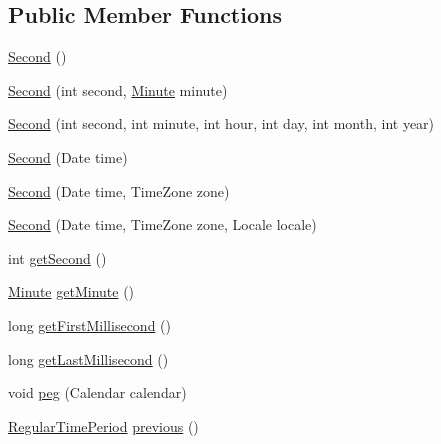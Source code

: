 \subsection*{Public Member Functions}
\begin{DoxyCompactItemize}
\item 
\mbox{\hyperlink{classorg_1_1jfree_1_1data_1_1time_1_1_second_a98b0191197851ed1fb2a351481ba4c08}{Second}} ()
\item 
\mbox{\hyperlink{classorg_1_1jfree_1_1data_1_1time_1_1_second_a120110e2361f440be3cb36c107f43898}{Second}} (int second, \mbox{\hyperlink{classorg_1_1jfree_1_1data_1_1time_1_1_minute}{Minute}} minute)
\item 
\mbox{\hyperlink{classorg_1_1jfree_1_1data_1_1time_1_1_second_a08c78518279e77e26804394a1cadd1c5}{Second}} (int second, int minute, int hour, int day, int month, int year)
\item 
\mbox{\hyperlink{classorg_1_1jfree_1_1data_1_1time_1_1_second_a99b5f9abe2c62ad3ec4a8fcea480c110}{Second}} (Date time)
\item 
\mbox{\hyperlink{classorg_1_1jfree_1_1data_1_1time_1_1_second_a6349bf85897f77365176fd8c3e306bc2}{Second}} (Date time, Time\+Zone zone)
\item 
\mbox{\hyperlink{classorg_1_1jfree_1_1data_1_1time_1_1_second_a37ddbb0efcd87f2f6a6bdce9df99ad81}{Second}} (Date time, Time\+Zone zone, Locale locale)
\item 
int \mbox{\hyperlink{classorg_1_1jfree_1_1data_1_1time_1_1_second_a14d76d21578a7d14d87e32d1e37997de}{get\+Second}} ()
\item 
\mbox{\hyperlink{classorg_1_1jfree_1_1data_1_1time_1_1_minute}{Minute}} \mbox{\hyperlink{classorg_1_1jfree_1_1data_1_1time_1_1_second_a63d13e976bb85ea05198449217e0fc0f}{get\+Minute}} ()
\item 
long \mbox{\hyperlink{classorg_1_1jfree_1_1data_1_1time_1_1_second_a86421f4381011662af27c142e677e20b}{get\+First\+Millisecond}} ()
\item 
long \mbox{\hyperlink{classorg_1_1jfree_1_1data_1_1time_1_1_second_af026da0a956634a29ae3070dc955576e}{get\+Last\+Millisecond}} ()
\item 
void \mbox{\hyperlink{classorg_1_1jfree_1_1data_1_1time_1_1_second_a417846010aa3a4fd29e215dfcc0690a9}{peg}} (Calendar calendar)
\item 
\mbox{\hyperlink{classorg_1_1jfree_1_1data_1_1time_1_1_regular_time_period}{Regular\+Time\+Period}} \mbox{\hyperlink{classorg_1_1jfree_1_1data_1_1time_1_1_second_aa0505f770b81ea0a466971bec8becf35}{previous}} ()

\end{DoxyCompactItemize}
